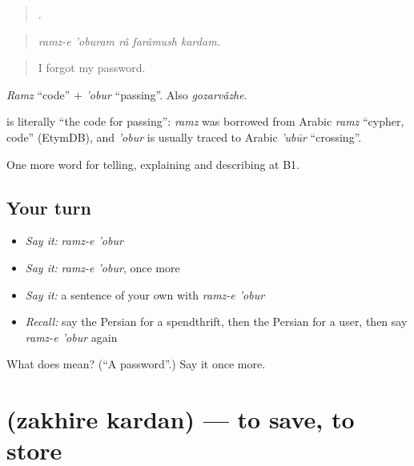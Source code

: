 \begin{quote}
    .
\end{quote}

\begin{quote}
\emph{ramz-e 'oburam râ farâmush kardam.}
\end{quote}

\begin{quote}
I forgot my password.
\end{quote}

\emph{Ramz} \textquotedblleft{}code\textquotedblright{} + \emph{'obur} \textquotedblleft{}passing\textquotedblright{}. Also \emph{gozarvâzhe}.

\begin{cousinweb}
\textbf{ } is literally \textquotedblleft{}the code for passing\textquotedblright{}: \emph{ramz} was borrowed from Arabic \emph{ramz} \textquotedblleft{}cypher, code\textquotedblright{} (EtymDB), and \emph{'obur} is usually traced to Arabic \emph{'ubūr} \textquotedblleft{}crossing\textquotedblright{}.
\end{cousinweb}

\begin{grammarlens}[title={What you've built}]
One more word for telling, explaining and describing at B1.
\end{grammarlens}

\subsection*{Your turn}
\begin{itemize}
\raggedright
  \item \emph{Say it:} \emph{ramz-e 'obur}
  \item \emph{Say it:} \emph{ramz-e 'obur}, once more
  \item \emph{Say it:} a sentence of your own with \emph{ramz-e 'obur}
  \item \emph{Recall:} say the Persian for a spendthrift, then the Persian for a user, then say \emph{ramz-e 'obur} again
\end{itemize}

\begin{tcolorbox}[breakable,colback=teal!4,colframe=teal!35!black,title={Before you move on}]
What does   mean? (\textquotedblleft{}A password\textquotedblright{}.) Say it once more.
\end{tcolorbox}
\section[\texorpdfstring{\fa{ذخیره} \fa{کردن} (zakhire kardan)}{ذخیره کردن (zakhire kardan)}]{  (zakhire kardan) — to save, to store}


